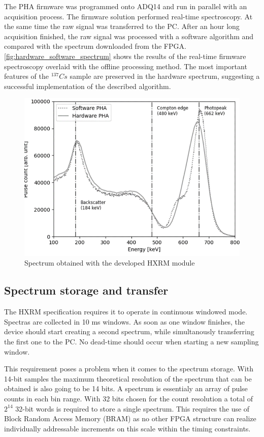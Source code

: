 The PHA firmware was programmed onto ADQ14 and run in parallel
with an acquisition process. The firmware solution performed real-time
spectroscopy. At the same time the raw signal was transferred to the PC.
After an hour long acquisition finished, the raw signal was processed 
with a software algorithm and compared with the spectrum downloaded from the FPGA.
\autoref{fig:hardware_software_spectrum}
shows the results of the real-time firmware spectroscopy overlaid
with the offline processing method. The most important features
of the $^{137} Cs$ sample are preserved in the hardware spectrum,
suggesting a successful implementation of the described algorithm.

\begin{figure}[H]
  \centering
  \includegraphics[width=\linewidth]{media/hardware_software_spectrum.png}
  \caption{Spectrum obtained with the developed HXRM module}
  \label{fig:hardware_software_spectrum} 
\end{figure}

\subsection{Spectrum storage and transfer}

The HXRM specification requires it to operate in continuous windowed mode.
Spectras are collected in 10 ms windows. As soon as one window finishes,
the device should start creating a second spectrum, while simultanously 
transferring the first one to the PC. No dead-time should occur 
when starting a new sampling window.


This requirement poses a problem when it comes to the spectrum storage.
With 14-bit samples the maximum theoretical resolution of the spectrum
that can be obtained is also going to be 14 bits. A spectrum is essentialy 
an array of pulse counts in each bin range. With 32 bits chosen 
for the count resolution a total of $2^{14}$ 32-bit words is required to 
store a single spectrum.
This requires the use of Block Random Access Memory (BRAM) as no other FPGA structure can realize
individually addressable increments on this scale within the timing constraints.


